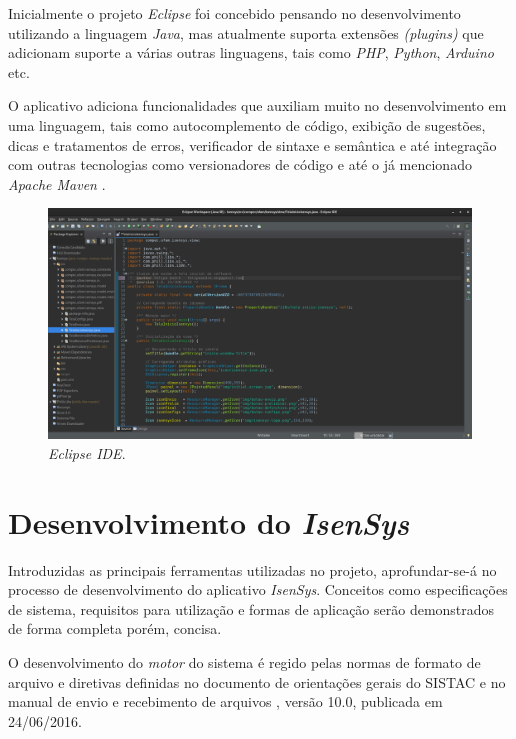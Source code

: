 \documentclass[
	12pt,			%
	openright,		%
	oneside,	
	a4paper,		%
	english,		%
	brazil			%
]{abntex2/abntex2}  %
\begin{document}
	Inicialmente o projeto \textit{Eclipse} \cite{eclipse} foi concebido pensando no desenvolvimento utilizando a linguagem \textit{Java}, mas atualmente suporta extensões \textit{(plugins)} que adicionam suporte a várias outras linguagens, tais como \textit{PHP}, \textit{Python}, \textit{Arduino} etc.
	
	O aplicativo adiciona funcionalidades que auxiliam muito no desenvolvimento em uma linguagem, tais como autocomplemento de código, exibição de sugestões, dicas e tratamentos de erros, verificador de sintaxe e semântica e até integração com outras tecnologias como versionadores de código e até o já mencionado \textit{Apache Maven} \cite{maven}.

	\begin{figure}[H]
		\caption{\label{eclipse-ide}\textit{Eclipse IDE}.}
		\begin{center}
			\includegraphics[scale=0.25]{img/eclipse-ide}
		\end{center}
	\end{figure}

\chapter{Desenvolvimento do \textit{IsenSys}}

	Introduzidas as principais ferramentas utilizadas no projeto, aprofundar-se-á no processo de desenvolvimento do aplicativo \textit{IsenSys}. Conceitos como especificações de sistema, requisitos para utilização e formas de aplicação serão demonstrados de forma completa porém, concisa.
	
	O desenvolvimento do \textit{motor} do sistema é regido pelas normas de formato de arquivo e diretivas definidas no documento de orientações gerais do SISTAC \cite{sistac-gerais} e no manual de envio e recebimento de arquivos \cite{sistac-formatos}, versão 10.0, publicada em 24/06/2016.
	
\end{document}
